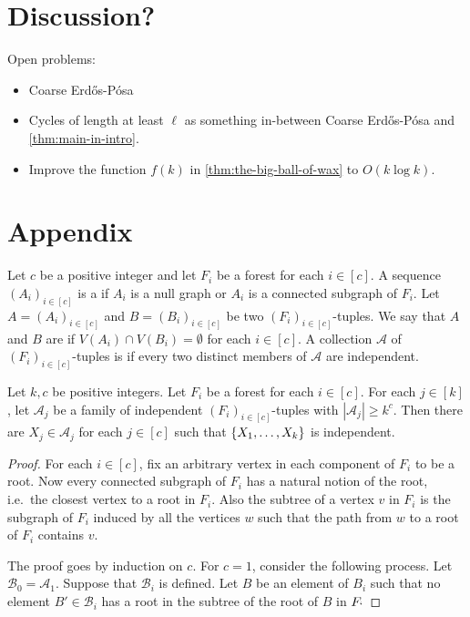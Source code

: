 \documentclass{patmorin}
\newenvironment{dummy}{}
\DeclarePairedDelimiter\set{\{}{\}}
\begin{document}
\begin{dummy}
\color{red}
\section{Discussion?}

Open problems:
\begin{itemize}
    \item Coarse Erd\H{o}s-Pósa
    \item Cycles of length at least $\ell$ as something in-between Coarse Erd\H{o}s-Pósa and \cref{thm:main-in-intro}.
    \item Improve the function $f(k)$ in \cref{thm:the-big-ball-of-wax} to $O(k\log k)$.
\end{itemize}
\end{dummy}




\section*{Appendix}
Let $c$ be a positive integer and 
let $F_i$ be a forest for each $i\in[c]$. 
A sequence $(A_i)_{i\in[c]}$ is a  if 
$A_i$ is a null graph or $A_i$ is a connected subgraph of $F_i$. 
Let $A=(A_i)_{i\in[c]}$ and $B=(B_i)_{i\in[c]}$ be two $(F_i)_{i\in[c]}$-tuples. 
We say that $A$ and $B$ are  if 
$V(A_i)\cap V(B_i)=\emptyset$ for each $i\in[c]$.
A collection $\mathcal{A}$ of $(F_i)_{i\in[c]}$-tuples is  if every two distinct members of $\mathcal{A}$ are independent.

\begin{lem}
Let $k,c$ be positive integers. 
Let $F_i$ be a forest for each $i\in[c]$.
For each $j\in [k]$, 
let $\mathcal{A}_j$ be a family of independent $(F_i)_{i\in[c]}$-tuples with $|\mathcal{A}_j|\geq k^c$. 
Then there are $X_j\in \mathcal{A}_j$ for each $j\in[c]$ such that $\set{X_1,\ldots,X_k}$ is independent.
\end{lem}
\begin{proof}
For each $i\in[c]$, fix an arbitrary vertex in each component of $F_i$ to be a root. Now every connected subgraph of $F_i$ has a natural notion of the root, i.e.\ the closest vertex to a root in $F_i$. 
Also the subtree of a vertex $v$ in $F_i$ is the subgraph of $F_i$ induced by all the vertices $w$ such that the path from $w$ to a root of $F_i$ contains $v$.

The proof goes by induction on $c$. 
For $c=1$, consider the following process. 
Let $\mathcal{B}_0=\mathcal{A}_1$. 
Suppose that $\mathcal{B}_i$ is defined. 
Let $B$ be an element of ${B}_i$ such that no element $B'\in\mathcal{B}_i$ has a root in the subtree of the root of $B$ in $F_`$ 
\end{proof}
\end{document}
